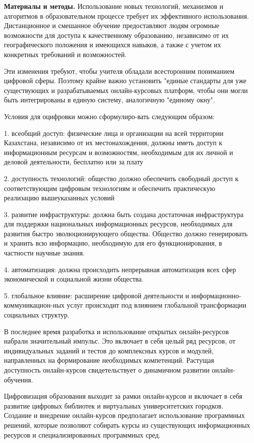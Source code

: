 \begin{multicols}{2}

{\bfseries Материалы и методы.} Использование новых технологий, механизмов
и алгоритмов в образовательном процессе требует их эффективного
использования. Дистанционное и смешанное обучение предоставляют людям
огромные возможности для доступа к качественному образованию, независимо
от их географического положения и имеющихся навыков, а также с учетом их
конкретных требований и возможностей.

Эти изменения требуют, чтобы учителя обладали всесторонним пониманием
цифровой сферы. Поэтому крайне важно установить "единые стандарты для
уже существующих и разрабатываемых онлайн-курсовых платформ, чтобы они
могли быть интегрированы в единую систему, аналогичную "единому окну".

Условия для оцифровки можно сформулиро-вать следующим образом:

1. всеобщий доступ: физические лица и организации на всей территории
Казахстана, независимо от их местонахождения, должны иметь доступ к
информационным ресурсам и возможностям, необходимым для их личной и
деловой деятельности, бесплатно или за плату

2. доступность технологий: общество должно обеспечить свободный доступ к
соответствующим цифровым технологиям и обеспечить практическую
реализацию вышеуказанных условий

3. развитие инфраструктуры: должна быть создана достаточная
инфраструктура для поддержки национальных информационных ресурсов,
необходимых для развития быстро эволюционирующего общества. Общество
должно генерировать и хранить всю информацию, необходимую для его
функционирования, в частности научные знания.

4. автоматизация: должна происходить непрерывная автоматизация всех сфер
экономической и социальной жизни общества.

5. глобальное влияние: расширение цифровой деятельности и
информационно-коммуникацион-ных услуг происходит под влиянием глобальной
трансформации социальных структур.

В последнее время разработка и использование открытых онлайн-ресурсов
набрали значительный импульс. Это включает в себя целый ряд ресурсов, от
индивидуальных заданий и тестов до комплексных курсов и модулей,
направленных на формирование необходимых компетенций. Растущая
доступность онлайн-курсов свидетельствует о динамичном развитии
онлайн-обучения.

Цифровизация образования выходит за рамки онлайн-курсов и включает в
себя развитие цифровых библиотек и виртуальных университетских городков.
Создание и внедрение онлайн-курсов предполагает использование
программных решений, которые позволяют собирать курсы из существующих
информационных ресурсов и специализированных программных сред.


\end{multicols}
